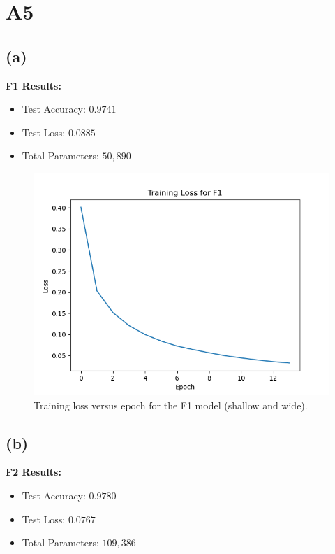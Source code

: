 \documentclass{article}
\begin{document}
\section*{A5}

\subsection*{(a)}

\textbf{F1 Results:}
\begin{itemize}
    \item Test Accuracy: \(0.9741\)
    \item Test Loss: \(0.0885\)
    \item Total Parameters: \(50,890\)
\end{itemize}

\begin{figure}[ht]
    \centering
    \includegraphics[width=0.75\linewidth]{F1_loss.png}
    \caption{Training loss versus epoch for the F1 model (shallow and wide).}
    \label{fig:f1_loss}
\end{figure}

\subsection*{(b)}

\textbf{F2 Results:}
\begin{itemize}
    \item Test Accuracy: \(0.9780\)
    \item Test Loss: \(0.0767\)
    \item Total Parameters: \(109,386\)
\end{itemize}
\end{document}
